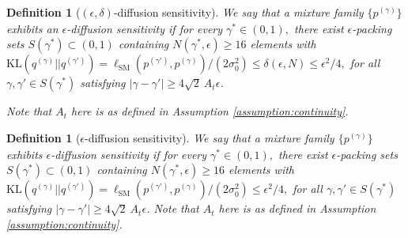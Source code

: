 \documentclass[11pt]{article}
\newcommand{\becca}[1]{\textcolor{dkred}{[becca: #1]}}
\theoremstyle{plain}
\newtheorem{definition}[theorem]{Definition}
\newcommand{\1}{\mathbbm{1}}
\newcommand{\lsm}{\ell_\mathrm{SM}}
\newcommand{\pdist}[2][]{p_{#1}^{(#2)}}
\newcommand{\qdist}[2][]{q_{#1}^{(#2)}}
\begin{document}
\begin{definition}[$(\epsilon,\delta)$-diffusion sensitivity]
\label{definition:diffusionSensitivity} We say that a mixture family $\{\pdist{\gamma}\}$ exhibits an $\epsilon$-diffusion sensitivity if for every $\gamma^* \in (0,1),$ there exist $\epsilon$-packing sets $S(\gamma^*) \subset (0,1)$ containing $N(\gamma^*,\epsilon) \geq 16$ elements with 
$\mathrm{KL}(\qdist{\gamma}||\qdist{\gamma'}) = \lsm(\pdist{\gamma'}, \pdist{\gamma})/(2\sigma_0^2) \leq \delta(\epsilon,N) \leq \epsilon^2/4,$ for all $\gamma, \gamma' \in S(\gamma^*)$ satisfying $|\gamma - \gamma'| \geq  4\sqrt{2}\: A_t \epsilon$. 

Note that $A_t$ here is as defined in Assumption \ref{assumption:continuity}.\end{definition}

\begin{definition}[$\epsilon$-diffusion sensitivity]
\label{definition:diffusionSensitivity} We say that a mixture family $\{\pdist{\gamma}\}$ exhibits $\epsilon$-diffusion sensitivity if for every $\gamma^* \in (0,1),$ there exist $\epsilon$-packing sets $S(\gamma^*) \subset (0,1)$ containing $N(\gamma^*,\epsilon) \geq 16$ elements with 
 $\mathrm{KL}(\qdist{\gamma}||\qdist{\gamma'}) = \lsm(\pdist{\gamma'}, \pdist{\gamma})/(2\sigma_0^2) \leq \epsilon^2/4,$ for all $\gamma, \gamma' \in S(\gamma^*)$ satisfying $|\gamma - \gamma'| \geq  4\sqrt{2}\: A_t \epsilon$. Note that $A_t$ here is as defined in Assumption \ref{assumption:continuity}.\end{definition}
 
\end{document}
